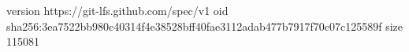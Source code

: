 version https://git-lfs.github.com/spec/v1
oid sha256:3ea7522bb980c40314f4e38528bff40fae3112adab477b7917f70c07c125589f
size 115081
